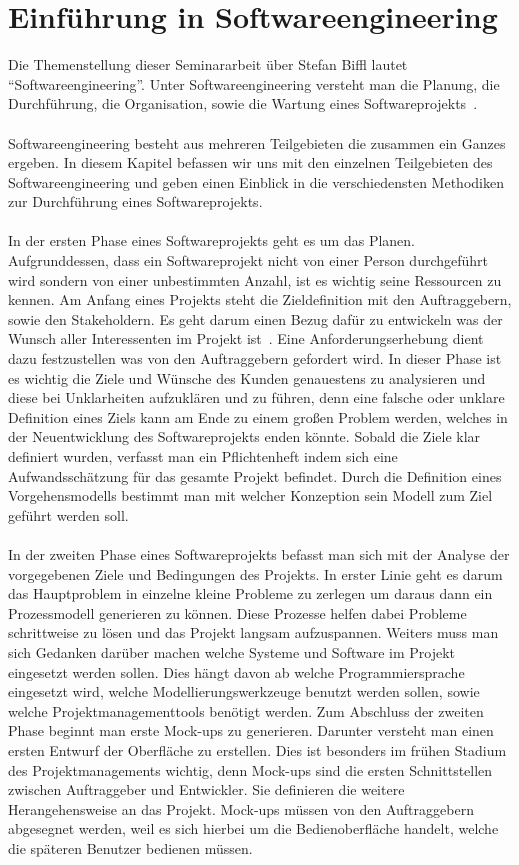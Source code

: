 \documentclass{llncs}
\begin{document}

\section{Einführung in Softwareengineering}

Die Themenstellung dieser Seminararbeit über Stefan Biffl lautet “Softwareengineering”. Unter Softwareengineering versteht man die Planung, die Durchführung, die Organisation, sowie die Wartung eines Softwareprojekts~\cite{book:SEChapter8}. 
\\ \\
Softwareengineering besteht aus mehreren Teilgebieten die zusammen ein Ganzes ergeben. In diesem Kapitel befassen wir uns mit den einzelnen Teilgebieten des Softwareengineering und geben einen Einblick in die verschiedensten Methodiken zur Durchführung eines Softwareprojekts.
\\ \\
In der ersten Phase eines Softwareprojekts geht es um das Planen. Aufgrunddessen, dass ein Softwareprojekt nicht von einer Person durchgeführt wird sondern von einer unbestimmten Anzahl, ist es wichtig seine Ressourcen zu kennen. Am Anfang eines Projekts steht die Zieldefinition mit den Auftraggebern, sowie den Stakeholdern. Es geht darum einen Bezug dafür zu entwickeln was der Wunsch aller Interessenten im Projekt ist~\cite{book:SEChapter10}. Eine Anforderungserhebung dient dazu festzustellen was von den Auftraggebern gefordert wird. In dieser Phase ist es wichtig die Ziele und Wünsche des Kunden genauestens zu analysieren und diese bei Unklarheiten aufzuklären und zu führen, denn eine falsche oder unklare Definition eines Ziels kann am Ende zu einem großen Problem werden, welches in der Neuentwicklung des Softwareprojekts enden könnte. Sobald die Ziele klar definiert wurden, verfasst man ein Pflichtenheft indem sich eine Aufwandsschätzung für das gesamte Projekt befindet. Durch die Definition eines Vorgehensmodells bestimmt man mit welcher Konzeption sein Modell zum Ziel geführt werden soll.
\\ \\
In der zweiten Phase eines Softwareprojekts befasst man sich mit der Analyse der vorgegebenen Ziele und Bedingungen des Projekts. In erster Linie geht es darum das Hauptproblem in einzelne kleine Probleme zu zerlegen um daraus dann ein Prozessmodell generieren zu können. Diese Prozesse helfen dabei Probleme schrittweise zu lösen und das Projekt langsam aufzuspannen. Weiters muss man sich Gedanken darüber machen welche Systeme und Software im Projekt eingesetzt werden sollen. Dies hängt davon ab welche Programmiersprache eingesetzt wird, welche Modellierungswerkzeuge benutzt werden sollen, sowie welche Projektmanagementtools benötigt werden. Zum Abschluss der zweiten Phase beginnt man erste Mock-ups zu generieren. Darunter versteht man einen ersten Entwurf der Oberfläche zu erstellen. Dies ist besonders im frühen Stadium des Projektmanagements wichtig, denn Mock-ups sind die ersten Schnittstellen zwischen Auftraggeber und Entwickler. Sie definieren die weitere Herangehensweise an das Projekt. Mock-ups müssen von den Auftraggebern abgesegnet werden, weil es sich hierbei um die Bedienoberfläche handelt, welche die späteren Benutzer bedienen müssen.
\end{document}
